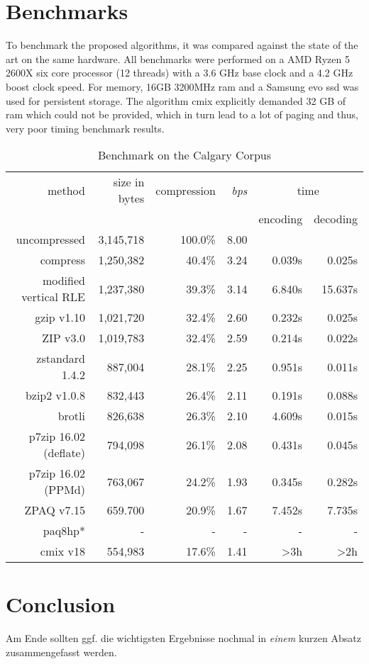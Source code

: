 \section{Benchmarks}
\label{ch:Evaluation:sec:Benchmarks}
\par{
	To benchmark the proposed algorithms, it was compared against the state of the art on the same hardware. All benchmarks were performed on a AMD Ryzen 5 2600X six core processor (12 threads) with a 3.6 GHz base clock and a 4.2 GHz boost clock speed. For memory, 16GB 3200MHz ram and a Samsung evo ssd was used for persistent storage. The algorithm cmix explicitly demanded 32 GB of ram which could not be provided, which in turn lead to a lot of paging and thus, very poor timing benchmark results.
}
	\begin{table}[h]
	\begin{tabular}{r|r|r|r|r|r}
		method  &  size in bytes & compression & \textit{bps} & \multicolumn{2}{c}{time }\\
		& & & & encoding & decoding\\
		\hline
		uncompressed & 3,145,718 & 100.0\% & 8.00 & &\\
		compress & 1,250,382 & 40.4\% & 3.24 & 0.039s & 0.025s\\
		modified vertical RLE & 1,237,380 & 39.3\%& 3.14 & 6.840s & 15.637s\\
		gzip v1.10 & 1,021,720 & 32.4\% & 2.60 & 0.232s & 0.025s\\
		ZIP v3.0 & 1,019,783 & 32.4\% & 2.59 & 0.214s & 0.022s\\
		zstandard 1.4.2& 887,004 & 28.1\% & 2.25 & 0.951s & 0.011s\\
		bzip2 v1.0.8 & 832,443 & 26.4\% & 2.11 & 0.191s & 0.088s\\
		brotli & 826,638 & 26.3\%& 2.10 & 4.609s & 0.015s\\
		p7zip 16.02 (deflate) &  794,098 & 26.1\% & 2.08 & 0.431s & 0.045s \\
		p7zip 16.02 (PPMd) &  763,067& 24.2\% & 1.93 & 0.345s & 0.282s\\
		ZPAQ v7.15 & 659.700 & 20.9\% & 1.67 & 7.452s & 7.735s\\
		paq8hp* & - & - & - & - & -\\ 
		cmix v18 & 554,983 & 17.6\% & 1.41 & >3h & >2h		
	\end{tabular}
	\label{tab:t100benchmark}
	\caption{Benchmark on the Calgary Corpus}
\end{table}

\par{

}

\section{Conclusion}
\label{ch:Evaluation:sec:Conclusion}

Am Ende sollten ggf. die wichtigsten Ergebnisse nochmal in \emph{einem} kurzen Absatz zusammengefasst werden.

